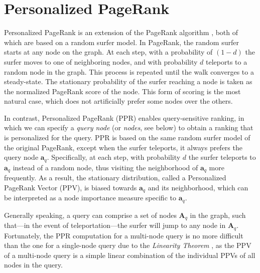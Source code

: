 \documentclass[11pt,oneside]{book}
\let\Oldsection\section
\renewcommand{\section}{\FloatBarrier\Oldsection}
\begin{document}
\section{Personalized PageRank}
Personalized PageRank is an extension of the PageRank algorithm \citep{page1999pagerank}, both of which are based on a random surfer model. In PageRank, the random surfer starts at any node on the graph. At each step, with a probability of $(1-d)$ the surfer moves to one of neighboring nodes, and with probability $d$ teleports to a random node in the graph. This process is repeated until the walk converges to a steady-state. The stationary probability of the surfer reaching a node is taken as the normalized PageRank score of the node. This form of scoring is the most natural case, which does not artificially prefer some nodes over the others.

In contrast, Personalized PageRank (PPR) enables query-sensitive ranking,
in which we can specify a \emph{query node} (or \emph{nodes}, see below) to obtain a ranking that is personalized for the query. PPR is based on the same random surfer model of the original PageRank, except when the surfer teleports, it always prefers the query node $\mathbf{a}_q$. 
Specifically, at each step, with probability $d$ the surfer teleports to $\mathbf{a}_q$ instead of a random node, thus visiting the neighborhood of $\mathbf{a}_q$ more frequently. As a result, the stationary distribution, called a Personalized PageRank Vector (PPV), is biased towards $\mathbf{a}_q$ and its neighborhood, which can be interpreted as a node importance measure specific to $\mathbf{a}_q$.

Generally speaking, a query can comprise a set of nodes $\mathbf{A}_q$ in the
graph, such that---in the event of teleportation---the surfer will jump to any node in $\mathbf{A}_q$. Fortunately, the PPR computation for a multi-node query is no more difficult than the one for a single-node query due to the \textit{Linearity Theorem} \citep{jeh2003scaling}, as the PPV of a multi-node query is a simple linear combination of the individual PPVs of all nodes in the query.

\end{document}
